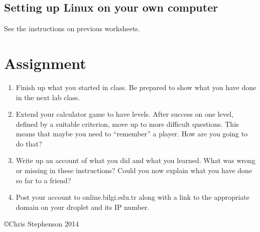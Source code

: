 \documentclass[12pt, a4paper]{article}
\begin{document}
\subsection*{Setting up Linux on your own computer}

See the instructions on previous worksheets.


\section*{Assignment}

\begin{enumerate}
\item Finish up what you started in class. Be prepared to show what you have done in the next lab class. 
\item Extend your calculator game to have levels. After success on one level, defined by a suitable criterion, move up to more difficult questions. This means that maybe you need to ``remember'' a player. How are you going to do that?
\item Write up an account of what you did and what you learned. What was wrong or missing in these instructions? Could you now explain what you have done so far to a friend?
\item Post your account to online.bilgi.edu.tr along with a link to the appropriate domain on your droplet and its IP number.

\end{enumerate}

\copyright Chris Stephenson 2014
\end{document}
